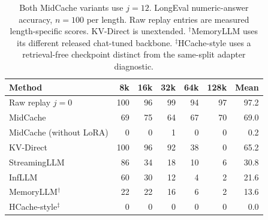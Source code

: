 \begin{table}[htbp]
\centering
\small
\setlength{\tabcolsep}{4pt}
\begin{tabular}{@{}lrrrrrr@{}}
\toprule
Method & 8k & 16k & 32k & 64k & 128k & Mean \\
\midrule
Raw replay $j=0$ & 100 & 96 & 99 & 94 & 97 & 97.2 \\
MidCache & 69 & 75 & 64 & 67 & 70 & 69.0 \\
MidCache (without LoRA) & 0 & 0 & 1 & 0 & 0 & 0.2 \\
KV-Direct & 100 & 96 & 92 & 38 & 0 & 65.2 \\
StreamingLLM & 86 & 34 & 18 & 10 & 6 & 30.8 \\
InfLLM & 60 & 30 & 12 & 4 & 2 & 21.6 \\
MemoryLLM$^\dagger$ & 22 & 22 & 16 & 6 & 2 & 13.6 \\
HCache-style$^{\ddagger}$ & 0 & 0 & 0 & 0 & 0 & 0.0 \\
\bottomrule
\end{tabular}
\caption{Both MidCache variants use $j=12$. LongEval numeric-answer accuracy, $n=100$ per length. Raw replay entries are measured length-specific scores. KV-Direct is unextended. $^\dagger$MemoryLLM uses its different released chat-tuned backbone. $^{\ddagger}$HCache-style uses a retrieval-free checkpoint distinct from the same-split adapter diagnostic.}
\label{tab:longeval-detail}
\end{table}
